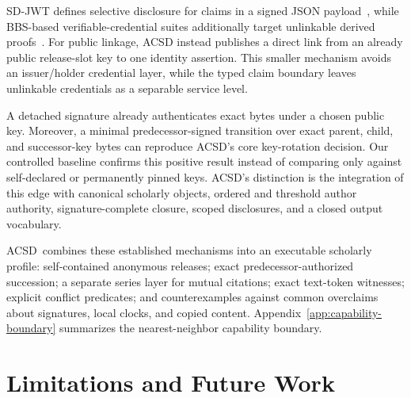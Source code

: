 \documentclass[conference,compsoc]{IEEEtran}
\newcommand{\acsd}{\textsc{ACSD}}
\begin{document}
SD-JWT defines selective disclosure for claims in a signed JSON payload~\cite{sdjwt}, while BBS-based verifiable-credential suites additionally target unlinkable derived proofs~\cite{bbs}. For public linkage, ACSD instead publishes a direct link from an already public release-slot key to one identity assertion. This smaller mechanism avoids an issuer/holder credential layer, while the typed claim boundary leaves unlinkable credentials as a separable service level.

A detached signature already authenticates exact bytes under a chosen public
key. Moreover, a minimal predecessor-signed transition over exact parent,
child, and successor-key bytes can reproduce ACSD's core key-rotation decision.
Our controlled baseline confirms this positive result instead of comparing only
against self-declared or permanently pinned keys. ACSD's distinction is the
integration of this edge with canonical scholarly objects, ordered and
threshold author authority, signature-complete closure, scoped disclosures,
and a closed output vocabulary.

\acsd\ combines these established mechanisms into an executable scholarly profile: self-contained anonymous releases; exact predecessor-authorized succession; a separate series layer for mutual citations; exact text-token witnesses; explicit conflict predicates; and counterexamples against common overclaims about signatures, local clocks, and copied content. Appendix~\ref{app:capability-boundary} summarizes the nearest-neighbor capability boundary.

\section{Limitations and Future Work}
\end{document}
